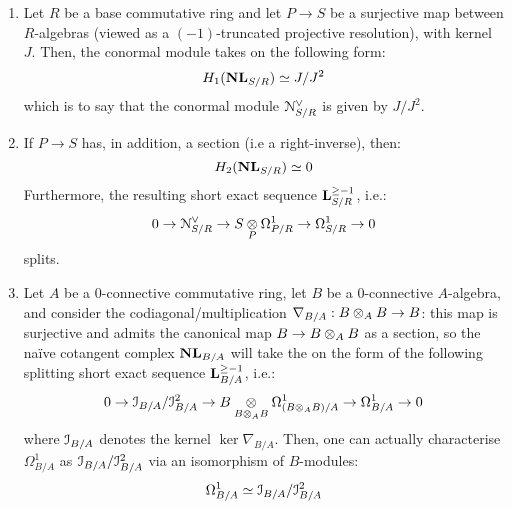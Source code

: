                 \begin{theorem} \label{theorem: computing_naive_cotangent_complexes}
                    \noindent
                    \begin{enumerate}
                        \item Let $R$ be a base commutative ring and let $P \to S$ be a surjective map between $R$-algebras (viewed as a $(-1)$-truncated projective resolution), with kernel $J$. Then, the conormal module takes on the following form:
                            $$H_1(\mathbf{NL}_{S/R}) \simeq J/J^2$$
                        which is to say that the conormal module $\mathcal{N}^{\vee}_{S/R}$ is given by $J/J^2$.
                        \item If $P \to S$ has, in addition, a section (i.e a right-inverse), then:
                            $$H_2(\mathbf{NL}_{S/R}) \simeq 0$$
                        Furthermore, the resulting short exact sequence $\mathbf{L}_{S/R}^{\geq -1}$, i.e.:
                            $$0 \to \calN^{\vee}_{S/R} \to S \tensor_P \Omega^1_{P/R} \to \Omega^1_{S/R} \to 0$$
                        splits.
                        \item Let $A$ be a $0$-connective commutative ring, let $B$ be a $0$-connective $A$-algebra, and consider the codiagonal/multiplication $\nabla_{B/A}: B \tensor_A B \to B$: this map is surjective and admits the canonical map $B \to B \tensor_A B$ as a section, so the na\"ive cotangent complex $\mathbf{NL}_{B/A}$ will take the on the form of the following splitting short exact sequence $\mathbf{L}_{B/A}^{\geq -1}$, i.e.:
                            $$0 \to \calI_{B/A}/\calI_{B/A}^2 \to B \tensor_{B \tensor_A B} \Omega^1_{(B \tensor_A B)/A} \to \Omega^1_{B/A} \to 0$$
                        where $\mathcal{I}_{B/A}$ denotes the kernel $\ker \nabla_{B/A}$. Then, one can actually characterise $\Omega^1_{B/A}$ as $\mathcal{I}_{B/A}/\mathcal{I}_{B/A}^2$ via an isomorphism of $B$-modules:
                            $$\Omega^1_{B/A} \simeq \mathcal{I}_{B/A}/\mathcal{I}_{B/A}^2$$
                    \end{enumerate}
                \end{theorem}
